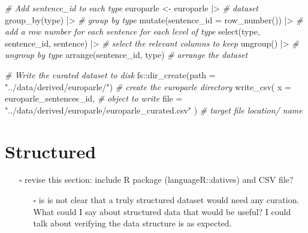 \documentclass[
  letterpaper,
  DIV=11,
  numbers=noendperiod]{scrreport}
\newenvironment{Shaded}{\begin{snugshade}}{\end{snugshade}}
\newcommand{\AttributeTok}[1]{\textcolor[rgb]{0.00,0.00,0.00}{#1}}
\newcommand{\CommentTok}[1]{\textcolor[rgb]{0.00,0.00,0.00}{\textit{#1}}}
\newcommand{\FunctionTok}[1]{\textcolor[rgb]{0.00,0.00,0.00}{#1}}
\newcommand{\NormalTok}[1]{\textcolor[rgb]{0.00,0.00,0.00}{#1}}
\newcommand{\OtherTok}[1]{\textcolor[rgb]{0.00,0.00,0.00}{#1}}
\newcommand{\SpecialCharTok}[1]{\textcolor[rgb]{0.00,0.00,0.00}{#1}}
\newcommand{\StringTok}[1]{\textcolor[rgb]{0.00,0.00,0.00}{#1}}
\providecommand{\tightlist}{%
  \setlength{\itemsep}{0pt}\setlength{\parskip}{0pt}}\usepackage{longtable,booktabs,array}
\theoremstyle{definition}
\theoremstyle{remark}
\begin{document}
\begin{Shaded}
\begin{Highlighting}[]
\CommentTok{\# Add \textasciigrave{}sentence\_id\textasciigrave{} to each \textasciigrave{}type\textasciigrave{}}
\NormalTok{europarle }\OtherTok{\textless{}{-}}
\NormalTok{  europarle }\SpecialCharTok{|\textgreater{}} \CommentTok{\# dataset}
  \FunctionTok{group\_by}\NormalTok{(type) }\SpecialCharTok{|\textgreater{}} \CommentTok{\# group by type}
  \FunctionTok{mutate}\NormalTok{(}\AttributeTok{sentence\_id =} \FunctionTok{row\_number}\NormalTok{()) }\SpecialCharTok{|\textgreater{}} \CommentTok{\# add a row number for each sentence for each level of type}
  \FunctionTok{select}\NormalTok{(type, sentence\_id, sentence) }\SpecialCharTok{|\textgreater{}} \CommentTok{\# select the relevant columns to keep}
  \FunctionTok{ungroup}\NormalTok{() }\SpecialCharTok{|\textgreater{}} \CommentTok{\# ungroup by type}
  \FunctionTok{arrange}\NormalTok{(sentence\_id, type) }\CommentTok{\# arrange the dataset}

\CommentTok{\# Write the curated dataset to disk}
\NormalTok{fs}\SpecialCharTok{::}\FunctionTok{dir\_create}\NormalTok{(}\AttributeTok{path =} \StringTok{"../data/derived/europarle/"}\NormalTok{) }\CommentTok{\# create the europarle directory}
\FunctionTok{write\_csv}\NormalTok{(}
  \AttributeTok{x =}\NormalTok{ europarle\_sentences\_id, }\CommentTok{\# object to write}
  \AttributeTok{file =} \StringTok{"../data/derived/europarle/europarle\_curated.csv"}
\NormalTok{) }\CommentTok{\# target file location/ name}
\end{Highlighting}
\end{Shaded}

\hypertarget{structured}{%
\section{Structured}\label{structured}}

\begin{itemize}
\tightlist
\item[$\square$]
  revise this section: include R package (languageR::datives) and CSV
  file?

  \begin{itemize}
  \tightlist
  \item[$\square$]
    is is not clear that a truly structured dataset would need any
    curation. What could I say about structured data that would be
    useful? I could talk about verifying the data structure is as
    expected.
  \end{itemize}
\end{itemize}
\end{document}

